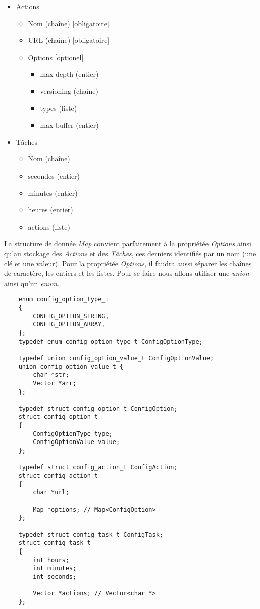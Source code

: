 \documentclass[conference]{IEEEtran}
\begin{document}
\begin{itemize}
    \item Actions
    \begin{itemize}
        \item Nom (chaîne) [obligatoire]
        \item URL (chaîne) [obligatoire]
        \item Options [optionel]
        \begin{itemize}
            \item max-depth (entier)
            \item versioning (chaîne)
            \item types (liste)
            \item max-buffer (entier)
        \end{itemize}
    \end{itemize}
    \item Tâches
    \begin{itemize}
        \item Nom (chaîne)
        \item secondes (entier)
        \item minutes (entier)
        \item heures (entier)
        \item actions (liste)
    \end{itemize}
\end{itemize}

La structure de donnée \textit{Map} convient parfaitement à la propriétée \textit{Options} ainsi qu'au stockage des \textit{Actions} et des \textit{Tâches}, ces derniers identifiés par un nom (une clé et une valeur).
Pour la propriétée \textit{Options}, il faudra aussi séparer les chaînes de caractère, les entiers et les listes. Pour se faire nous allons utiliser une \textit{union} ainsi qu'un \textit{enum}.

\break
\begin{lstlisting}
    enum config_option_type_t
    {
        CONFIG_OPTION_STRING,
        CONFIG_OPTION_ARRAY,
    };
    typedef enum config_option_type_t ConfigOptionType;
    
    typedef union config_option_value_t ConfigOptionValue;
    union config_option_value_t {
        char *str;
        Vector *arr;
    };

    typedef struct config_option_t ConfigOption;
    struct config_option_t
    {
        ConfigOptionType type;
        ConfigOptionValue value;
    };

    typedef struct config_action_t ConfigAction;
    struct config_action_t
    {
        char *url;
    
        Map *options; // Map<ConfigOption>
    };

    typedef struct config_task_t ConfigTask;
    struct config_task_t
    {
        int hours;
        int minutes;
        int seconds;
    
        Vector *actions; // Vector<char *>
    };
\end{lstlisting}
\end{document}
